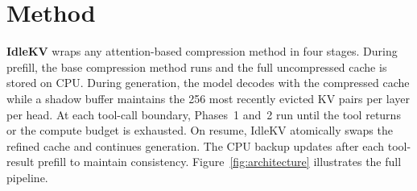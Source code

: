 \documentclass[10pt,twocolumn,letterpaper]{article}
\begin{document}
\section{Method}
\label{sec:method}

\textbf{IdleKV} wraps any attention-based compression method in four stages.
During prefill, the base compression method runs and the full uncompressed
cache is stored on CPU.
During generation, the model decodes with the compressed cache while a shadow
buffer maintains the 256 most recently evicted KV pairs per layer per head.
At each tool-call boundary, Phases~1 and~2 run until the tool returns or the
compute budget is exhausted.
On resume, IdleKV atomically swaps the refined cache and continues generation.
The CPU backup updates after each tool-result prefill to maintain consistency.
Figure~\ref{fig:architecture} illustrates the full pipeline.
\end{document}

